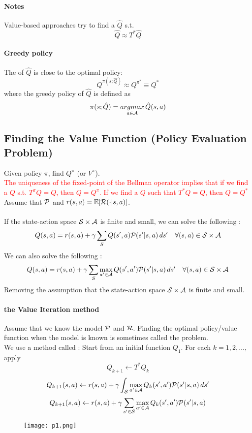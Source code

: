 \documentclass[11pt]{article}
\begin{document}
\paragraph{Notes}
Value-based approaches try to find a $\hat{Q}$ s.t.
$$\hat{Q} \approx T^*\hat{Q}$$
\paragraph{Greedy policy}
The  of $\hat{Q}$ is close to the optimal policy:
$$Q^{\pi(s;\hat{Q})} \approx Q^{\pi^*} \equiv Q^*$$
where the greedy policy of $\hat{Q}$ is defined as 
$$\pi(s;\hat{Q}) = \underset{a \in \mathcal{A}}{argmax}\, \hat{Q}(s,a)$$

\subsection{Finding the Value Function (Policy Evaluation Problem)}
Given policy $\pi$, find $Q^\pi$ (or $V^\pi$). \\
\textcolor{red}{The uniqueness of the fixed-point of the Bellman operator implies that if we find a $Q$ s.t. $T^\pi Q = Q$, then $Q = Q^\pi$. If we find a $Q$ such that $T^*Q = Q$, then $Q = Q^*$} \\
Assume that $\mathcal{P}$ and $r(s,a) = \mathbb{E}[\mathcal{R}(\cdot|s,a)]$. \\
 \\
If the state-action space $\mathcal{S} \times \mathcal{A}$ is finite and small, we can solve the following :
$$Q(s, a) = r(s,a) + \gamma \sum_S Q(s', a)\mathcal{P}(s'|s,a)\,ds' \quad \forall(s,a) \in \mathcal{S} \times \mathcal{A}$$
We can also solve the following :
$$Q(s, a) = r(s,a) + \gamma \sum_S \underset{a' \in \mathcal{A}}{\max}\,Q(s', a')\mathcal{P}(s'|s,a)\,ds' \quad \forall(s,a) \in \mathcal{S} \times \mathcal{A}$$
 Removing the assumption that the state-action space $\mathcal{S} \times \mathcal{A}$ is finite and small.
\paragraph{the Value Iteration method}
Assume that we know the model $\mathcal{P}$ and $\mathcal{R}$. Finding the optimal policy/value function when the model is known is sometimes called the  problem.\\ 
We use a method called : Start from an initial function $Q_1$. For each $k = 1,2,\hdots$, apply
$$Q_{k+1} \leftarrow T^*Q_k$$
$$Q_{k+1}(s,a) \leftarrow r(s,a) + \gamma \int_{\mathcal{S}} \underset{a' \in \mathcal{A}}{\max}\,Q_k(s', a')\mathcal{P}(s'|s,a)\,ds'$$
$$Q_{k+1}(s,a) \leftarrow r(s,a) + \gamma \sum_{s' \in \mathcal{S}} \underset{a' \in \mathcal{A}}{\max}\,Q_k(s', a')\mathcal{P}(s'|s,a)$$
\begin{figure}[H]
	\centering
	\texttt{[image: p1.png]}
\end{figure}
\end{document}
